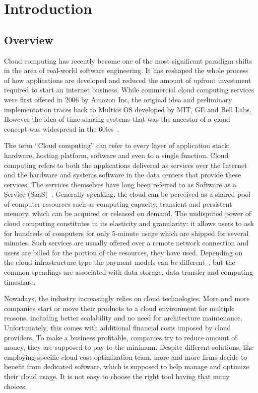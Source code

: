 \documentclass[licencjacka,en]{thesisclass}
\begin{document}
    \chapter{Introduction}


    \section{Overview}

    Cloud computing has recently become one of the most significant paradigm shifts
    in the area of real-world software engineering.
    It has reshaped the whole process of how applications are developed
    and reduced the amount of upfront
    investment required to start an internet business.
    While commercial cloud computing services were first offered
    in 2006 by Amazon Inc, the original idea and preliminary
    implementation traces back to Multics OS developed by MIT,
    GE and Bell Labs.
    However the idea of time-sharing systems that was the ancestor of a cloud
    concept was widespread in the 60ies~\cite{Markus}.

    The term “Cloud computing” can refer to every layer of application stack:
    hardware, hosting platform, software and even to a single function.
    Cloud computing refers to both the applications delivered as services over the Internet
    and the hardware and systems software in the data centers that provide these services.
    The services themselves have long been referred to
    as Software as a Service (SaaS)~\cite{Armbrust}.
    Generally speaking, the cloud can be perceived as a shared pool
    of computer resources such as computing capacity,
    transient and persistent memory, which can be acquired or released on demand.
    The undisputed power of cloud computing constitutes
    in its elasticity and granularity: it allows users
    to ask for hundreds of computers for only 5-minute usage which
    are shipped for several minutes.
    Such services are usually offered over a remote network connection and users are billed
    for the portion of the resources, they have used.
    Depending on the cloud infrastructure type the payment models
    can be different~\cite{Laatikainen},
    but the common spendings are associated with data storage,
    data transfer and computing timeshare.

    Nowadays, the industry increasingly relies on cloud technologies.
    More and more companies start or move their products to a cloud environment
    for multiple reasons, including better scalability
    and no need for architecture maintenance.
    Unfortunately, this comes with additional financial costs imposed by cloud providers.
    To make a business profitable, companies try
    to reduce amount of money, they are supposed to pay to the minimum.
    Despite different solutions, like employing specific
    cloud cost optimization team, more and more firms decide
    to benefit from dedicated software, which is supposed to help
    manage and optimize their cloud usage.
    It is not easy to choose the right tool having that many choices.
\end{document}
